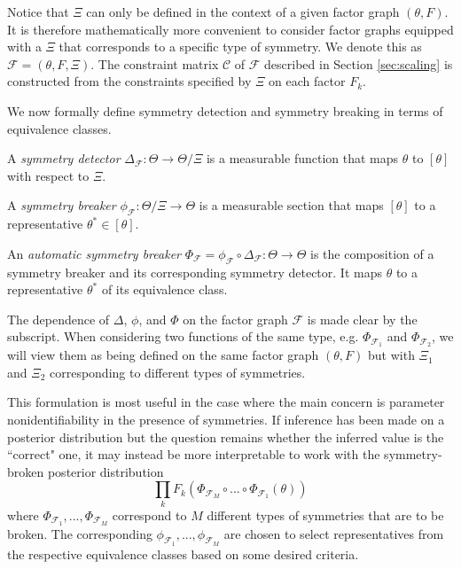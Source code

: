 Notice that $\Xi$ can only be defined in the context of a given factor graph $(\theta,F)$. It is therefore mathematically more convenient to consider factor graphs equipped with a $\Xi$ that corresponds to a specific type of symmetry. We denote this as $\mathcal{F}=(\theta,F,\Xi)$. The constraint matrix $\mathcal{C}$ of $\mathcal{F}$ described in Section \ref{sec:scaling} is constructed from the constraints specified by $\Xi$ on each factor $F_k$.

We now formally define symmetry detection and symmetry breaking in terms of equivalence classes.

\begin{defn}
A \textit{symmetry detector} $\Delta_\mathcal{F}:\Theta\rightarrow\Theta/\Xi$ is a measurable function that maps $\theta$ to $[\theta]$ with respect to $\Xi$.
\end{defn}

\begin{defn}
A \textit{symmetry breaker} $\phi_\mathcal{F}:\Theta/\Xi\rightarrow\Theta$ is a measurable section that maps $[\theta]$ to a representative $\theta^*\in[\theta]$.
\end{defn}

\begin{defn}
An \textit{automatic symmetry breaker} $\Phi_\mathcal{F}=\phi_\mathcal{F}\circ\Delta_\mathcal{F}:\Theta\rightarrow\Theta$ is the composition of a symmetry breaker and its corresponding symmetry detector. It maps $\theta$ to a representative $\theta^*$ of its equivalence class.
\end{defn}

The dependence of $\Delta$, $\phi$, and $\Phi$ on the factor graph $\mathcal{F}$ is made clear by the subscript. When considering two functions of the same type, e.g. $\Phi_{\mathcal{F}_1}$ and $\Phi_{\mathcal{F}_2}$, we will view them as being defined on the same factor graph $(\theta,F)$ but with $\Xi_1$ and $\Xi_2$ corresponding to different types of symmetries.

This formulation is most useful in the case where the main concern is parameter nonidentifiability in the presence of symmetries. If inference has been made on a posterior distribution but the question remains whether the inferred value is the ``correct" one, it may instead be more interpretable to work with the symmetry-broken posterior distribution
\[
\prod_kF_k(\Phi_{\mathcal{F}_M}\circ ...\circ\Phi_{\mathcal{F}_1}(\theta))
\]
where $\Phi_{\mathcal{F}_1},...,\Phi_{\mathcal{F}_M}$ correspond to $M$ different types of symmetries that are to be broken. The corresponding $\phi_{\mathcal{F}_1},...,\phi_{\mathcal{F}_M}$ are chosen to select representatives from the respective equivalence classes based on some desired criteria.

